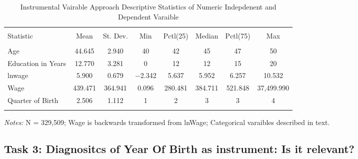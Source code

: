 \documentclass[a4paper]{article}
\begin{document}
\begin{table}[!htbp] 
\begin{adjustwidth}{-0cm}{-0cm}
\begin{threeparttable}
\small
\captionsetup{font=small, justification=raggedright,singlelinecheck=false}
  \caption{Instrumental Vairable Approach Descriptive Statistics of Numeric Indepdenent and Dependent Varaible} 
  \label{} 
\begin{tabular}{@{\extracolsep{5pt}}lccccccc} 
\\[-5.8ex]\hline 
\hline \\[-1.8ex] 
Statistic & \multicolumn{1}{c}{Mean} & \multicolumn{1}{c}{St. Dev.} & \multicolumn{1}{c}{Min} & \multicolumn{1}{c}{Pctl(25)} & \multicolumn{1}{c}{Median} & \multicolumn{1}{c}{Pctl(75)} & \multicolumn{1}{c}{Max} \\ 
\hline \\[-1.8ex] 
Age & 44.645 & 2.940 & 40 & 42 & 45 & 47 & 50 \\ 
Education in Years & 12.770 & 3.281 & 0 & 12 & 12 & 15 & 20 \\ 
lnwage & 5.900 & 0.679 & $-$2.342 & 5.637 & 5.952 & 6.257 & 10.532 \\ 
Wage & 439.471 & 364.941 & 0.096 & 280.481 & 384.711 & 521.848 & 37,499.990 \\ 
Quarter of Birth & 2.506 & 1.112 & 1 & 2 & 3 & 3 & 4 \\ 
\hline \\
[-3.5ex] 
\end{tabular} 
\begin{tablenotes}
      \small
      \item\textit{Notes:} N = 329,509; Wage is backwards transformed from lnWage; Categorical varaibles described in text.
    \end{tablenotes}
\end{threeparttable}
\end{adjustwidth}
\end{table}



\subsection{Task 3: Diagnositcs of Year Of Birth as instrument: Is it relevant?}
\end{document}
